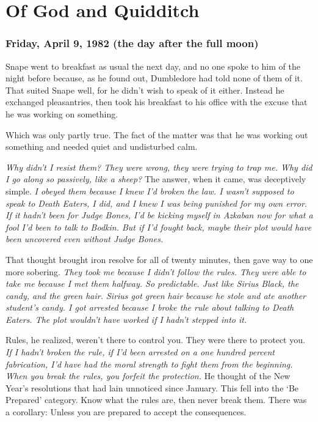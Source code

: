 
\chapter{Of God and Quidditch}

\subsection{Friday, April 9, 1982 (the day after the full moon)}

Snape went to breakfast as usual the next day, and no one spoke to him of the night before because, as he found out, Dumbledore had told none of them of it. That suited Snape well, for he didn't wish to speak of it either. Instead he exchanged pleasantries, then took his breakfast to his office with the excuse that he was working on something.

Which was only partly true. The fact of the matter was that he was working out something and needed quiet and undisturbed calm.

\emph{Why didn't I resist them? They were wrong, they were trying to trap me. Why did I go along so passively, like a sheep?} The answer, when it came, was deceptively simple. \emph{I obeyed them because I knew I'd broken the law. I wasn't supposed to speak to Death Eaters, I did, and I knew I was being punished for my own error. If it hadn't been for Judge Bones, I'd be kicking myself in Azkaban now for what a fool I'd been to talk to Bodkin. But if I'd fought back, maybe their plot would have been uncovered even without Judge Bones.}

That thought brought iron resolve for all of twenty minutes, then gave way to one more sobering. \emph{They took me because I didn't follow the rules. They were able to take me because I met them halfway. So predictable. Just like Sirius Black, the candy, and the green hair. Sirius got green hair because he stole and ate another student's candy. I got arrested because I broke the rule about talking to Death Eaters. The plot wouldn't have worked if I hadn't stepped into it.}

Rules, he realized, weren't there to control you. They were there to protect you. \emph{If I hadn't broken the rule, if I'd been arrested on a one hundred percent fabrication, I'd have had the moral strength to fight them from the beginning. When you break the rules, you forfeit the protection.} He thought of the New Year's resolutions that had lain unnoticed since January. This fell into the `Be Prepared' category. Know what the rules are, then never break them. There was a corollary: Unless you are prepared to accept the consequences.

